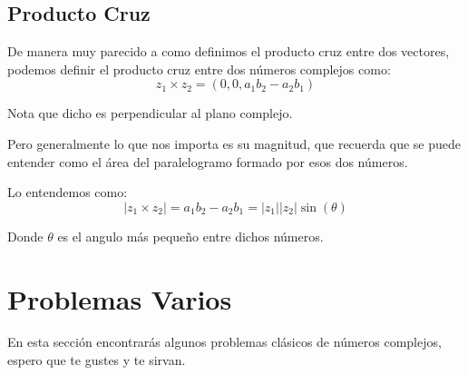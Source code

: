 \documentclass[12pt, fleqn]{report}                             %
\newcommand \Quote {\qq}                                        %
\newcommand{\Wrap}[1]{\left( #1 \right)}                        %
\newcommand{\Sin}[1]{\sin\Wrap{#1}}                             %
\begin{document}
            \subsection{Producto Cruz}

                De manera muy parecido a como definimos el producto cruz entre dos
                vectores, podemos definir el producto cruz entre dos números complejos
                como:
                \begin{equation}
                    z_1 \times z_2 = (0, 0, a_1 b_2 - a_2 b_1)
                \end{equation}

                Nota que dicho \Quote{vector} es perpendicular al plano complejo.

                Pero generalmente lo que nos importa es su magnitud, que recuerda
                que se puede entender como el área del paralelogramo formado por
                esos dos números.

                Lo entendemos como:
                \begin{equation}
                    |z_1 \times z_2|
                        = a_1 b_2 - a_2 b_1 
                        = |z_1||z_2| \Sin{\theta}
                \end{equation}

                Donde $\theta$ es el angulo más pequeño entre dichos números.


        \clearpage
        \section{Problemas Varios}

            En esta sección encontrarás algunos problemas clásicos de números
            complejos, espero que te gustes y te sirvan.
\end{document}

